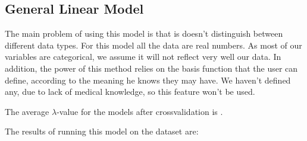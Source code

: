 



\subsection{General Linear Model}

The main problem of using this model is that is doesn't distinguish between different data types. For this model all the data are real numbers. As most of our variables are categorical, we assume it will not reflect very well our data. In addition, the power of this method relies on the basis function that the user can define, according to the meaning he knows they may have. We haven't defined any, due to lack of medical knowledge, so this feature won't be used.

The average \(\lambda\)-value for the models after crossvalidation is .

The results of running this model on the dataset are:


